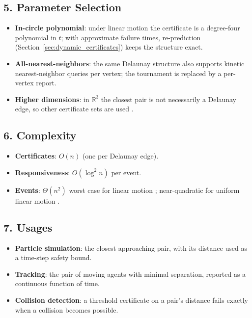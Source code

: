 \subsection{5. Parameter Selection}

\begin{itemize}
  \item \textbf{In-circle polynomial}: under linear motion the certificate is
    a degree-four polynomial in $t$; with approximate failure times,
    re-prediction (Section~\ref{sec:dynamic_certificates}) keeps the
    structure exact.
  \item \textbf{All-nearest-neighbors}: the same Delaunay structure also
    supports kinetic nearest-neighbor queries per vertex; the tournament is
    replaced by a per-vertex report.
  \item \textbf{Higher dimensions}: in $\mathbb{R}^3$ the closest pair is
    not necessarily a Delaunay edge, so other certificate sets are used
    \cite{basch1997proximity}.
\end{itemize}

\subsection{6. Complexity}

\begin{itemize}
  \item \textbf{Certificates}: $O(n)$ (one per Delaunay edge).
  \item \textbf{Responsiveness}: $O(\log^2 n)$ per event.
  \item \textbf{Events}: $\Theta(n^2)$ worst case for linear motion
    \cite{albers1998}; near-quadratic for uniform linear motion
    \cite{rubin2016}.
\end{itemize}

\subsection{7. Usages}

\begin{itemize}
  \item \textbf{Particle simulation}: the closest approaching pair, with its
    distance used as a time-step safety bound.
  \item \textbf{Tracking}: the pair of moving agents with minimal separation,
    reported as a continuous function of time.
  \item \textbf{Collision detection}: a threshold certificate on a pair's
    distance fails exactly when a collision becomes possible.
\end{itemize}

